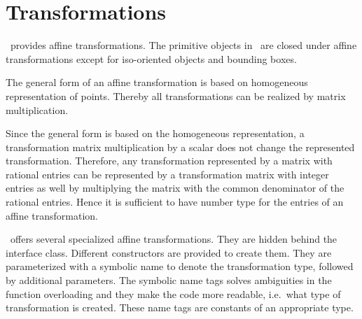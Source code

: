 
\chapter{Transformations}\label{AffTransformation}

\cgal\ provides affine transformations. The primitive objects in
\cgal\ are closed under affine transformations except
for iso-oriented objects and bounding boxes.

The general form of an affine transformation is based on homogeneous
representation of points. Thereby all transformations can be realized by
matrix multiplication. 

Since the general form is based on the homogeneous representation, a
transformation matrix multiplication by a scalar does not change
the represented transformation. Therefore, any transformation represented
by a matrix with rational entries can be represented by a 
transformation matrix with integer entries as well by multiplying
the matrix with the common denominator of the rational entries. 
Hence it is sufficient to have number type  for the entries 
of an affine transformation.

\cgal\ offers several specialized affine transformations. They are
hidden behind the interface class.
Different constructors are provided to create them. 
They are parameterized with a symbolic name to
denote the transformation type, followed by additional parameters.
The symbolic name tags solves ambiguities in the function
overloading and they make the code more readable, i.e.\ what type
of transformation is created. These name tags are constants of an
appropriate type.

\threecolumns{6cm}{3.5cm}




